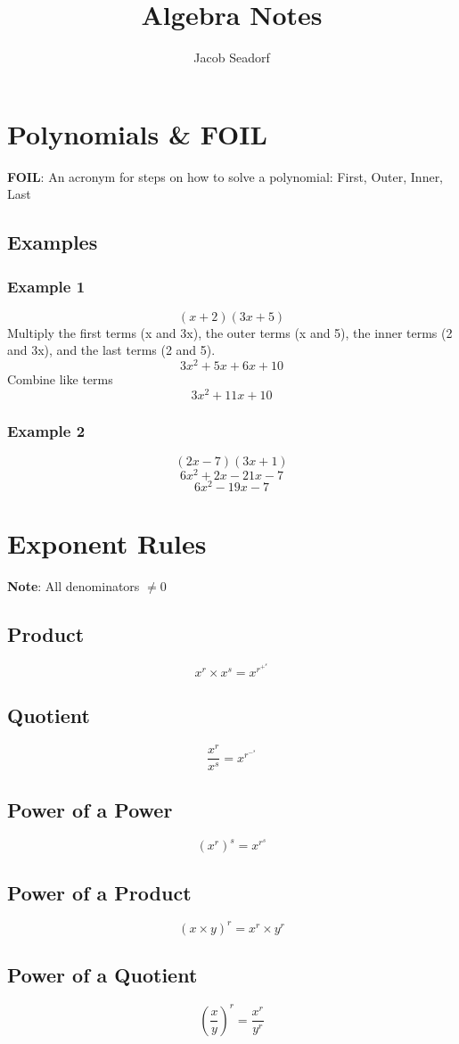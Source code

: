 \documentclass{article}
\title{Algebra Notes}
\author{Jacob Seadorf}
\begin{document}
	\maketitle
\section{Polynomials \& FOIL}
\textbf{FOIL}: An acronym for steps on how to solve a polynomial: First, Outer, Inner, Last
\subsection{Examples}
\subsubsection{Example 1}
$$
(x+2)(3x+5)
$$
Multiply the first terms (x and 3x), the outer terms (x and 5), the inner terms (2 and 3x), and the last terms (2 and 5).
$$
3x^2 + 5x + 6x + 10
$$
Combine like terms
$$
3x^2 + 11x + 10
$$

\subsubsection{Example 2}
$$(2x - 7)(3x + 1)$$
$$6x^2 + 2x - 21x - 7$$
$$6x^2 - 19x - 7$$

\section{Exponent Rules}
\textbf{Note}: All denominators $\ne 0$
\subsection{Product} 
	$$
	x^r \times x^s = x^r^+^s
	$$
\subsection{Quotient}
	$$
	\frac{x^r}{x^s} = x^r^-^s
	$$
\subsection{Power of a Power}
	$$
	(x^r)^s = x^r^s
	$$
\subsection{Power of a Product}
	$$
	(x \times y)^r = x^r \times y^r
	$$
\subsection{Power of a Quotient}
	$$
	\left(\frac{x}{y}\right)^r = \frac{x^r}{y^r}	
	$$
\end{document}
